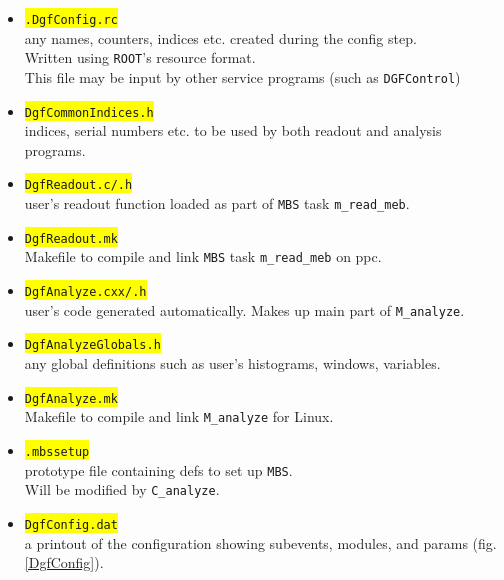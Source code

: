 \documentclass[10pt]{article}
\newcommand{\yellow}[1]{\colorbox{yellow}{\texttt{#1}}}
\begin{document}
\begin{itemize}
\setlength{\rightmargin}{1em}%
\setlength{\leftmargin}{2em}%
\setlength{\itemsep}{0pt}%
\setlength{\parskip}{1mm}%
\setlength{\partopsep}{0pt}%
\setlength{\parsep}{0pt}%
\setlength{\topsep}{0pt}%
\item	\yellow{.DgfConfig.rc}\\
	any names, counters, indices etc. created during the config step.\\
	Written using \texttt{ROOT}'s resource format.\\
	This file may be input by other service programs (such as \texttt{DGFControl}) 
\item	\yellow{DgfCommonIndices.h}\\
	indices, serial numbers etc. to be used by both readout and analysis programs.
\item	\yellow{DgfReadout.c/.h}\\
	user's readout function loaded as part of \texttt{MBS} task \texttt{m\_read\_meb}.
\item	\yellow{DgfReadout.mk}\\
	Makefile to compile and link \texttt{MBS} task \texttt{m\_read\_meb} on ppc.
\item	\yellow{DgfAnalyze.cxx/.h}\\
	user's code generated automatically. Makes up main part of \texttt{M\_analyze}.
\item	\yellow{DgfAnalyzeGlobals.h}\\
	any global definitions such as user's histograms, windows, variables.
\item	\yellow{DgfAnalyze.mk}\\
	Makefile to compile and link \texttt{M\_analyze} for Linux.
\item	\yellow{.mbssetup}\\
	prototype file containing defs to set up \texttt{MBS}.\\
	Will be modified by \texttt{C\_analyze}.
\item	\yellow{DgfConfig.dat}\\
	a printout of the configuration showing subevents, modules, and params (fig.\ref{DgfConfig}).
\end{itemize}
\end{document}
